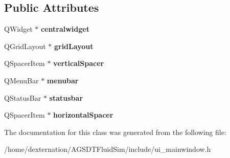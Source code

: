 \subsection*{Public Attributes}
\begin{DoxyCompactItemize}
\item 
\hypertarget{class_ui___main_window_a39420100bfee3ba57f137af5a3b0f8e9}{Q\-Widget $\ast$ {\bfseries centralwidget}}\label{class_ui___main_window_a39420100bfee3ba57f137af5a3b0f8e9}

\item 
\hypertarget{class_ui___main_window_ac4586abe48f0aabf940b0dc2df3772ed}{Q\-Grid\-Layout $\ast$ {\bfseries grid\-Layout}}\label{class_ui___main_window_ac4586abe48f0aabf940b0dc2df3772ed}

\item 
\hypertarget{class_ui___main_window_a8384329c3663ff274e926a12024aab52}{Q\-Spacer\-Item $\ast$ {\bfseries vertical\-Spacer}}\label{class_ui___main_window_a8384329c3663ff274e926a12024aab52}

\item 
\hypertarget{class_ui___main_window_a734b1d3bb71c1b8e1ea01b7fa4344fce}{Q\-Menu\-Bar $\ast$ {\bfseries menubar}}\label{class_ui___main_window_a734b1d3bb71c1b8e1ea01b7fa4344fce}

\item 
\hypertarget{class_ui___main_window_a07519bbb9a350befd6feb4e84ef299fd}{Q\-Status\-Bar $\ast$ {\bfseries statusbar}}\label{class_ui___main_window_a07519bbb9a350befd6feb4e84ef299fd}

\item 
\hypertarget{class_ui___main_window_a7871ea8c4b6c595d7ccd53960b344719}{Q\-Spacer\-Item $\ast$ {\bfseries horizontal\-Spacer}}\label{class_ui___main_window_a7871ea8c4b6c595d7ccd53960b344719}

\end{DoxyCompactItemize}


The documentation for this class was generated from the following file\-:\begin{DoxyCompactItemize}
\item 
/home/dexternation/\-A\-G\-S\-D\-T\-Fluid\-Sim/include/ui\-\_\-mainwindow.\-h\end{DoxyCompactItemize}
